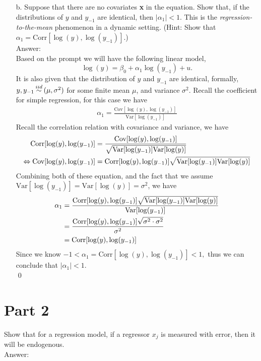 \documentclass[10pt]{article}
\newcommand\iid{\stackrel{\mathclap{iid}}{\sim}}
\newcommand{\V}{\text{Var}}
\newcommand{\corr}{\text{Corr}}
\newcommand{\cov}{\text{Cov}}
\begin{document}
\begin{enumerate}
\item[b.] Suppose that there are no covariates \textbf{x} in the equation. Show that, if the distributions of $y$ and $y_{-1}$ are identical, then $|\alpha_1|<1$. This is the \textit{regression-to-the-mean}
phenomenon in a dynamic setting. (Hint: Show that $\alpha_1=\corr[\log(y),\log(y_{-1})].$)
\\ Answer: \\
Based on the prompt we will have the following linear model,
\[\log(y)=\beta_0+\alpha_1\log(y_{-1})+u.\]
It is also given that the distribution of $y$ and $y_{-1}$ are identical, formally, $y,y_{-1}\iid(\mu,\sigma^2)$ for some finite mean $\mu$, and variance $\sigma^2$. Recall the coefficient for simple regression, for this case we have
\begin{align}
    \alpha_1=\frac{\cov[\log(y),\log(y_{-1})]}{\V[\log(y_{-1})]}
\end{align}
Recall the correlation relation with covariance and variance, we have
\begin{align}
    \corr[\log(y),\log(y_{-1})]&=\frac{\cov[\log(y),\log(y_{-1})]}{\sqrt{\V[\log(y_{-1})]\V[\log(y)]}} \notag \\
    \Leftrightarrow \cov[\log(y),\log(y_{-1})]&= \corr[\log(y),\log(y_{-1})] \sqrt{\V[\log(y_{-1})]\V[\log(y)]}
\end{align}
Combining both of these equation, and the fact that we assume $\V[\log(y_{-1})]=\V[\log(y)]=\sigma^2$, we have
\begin{align}
    \alpha_1&=\frac{\corr[\log(y),\log(y_{-1})] \sqrt{\V[\log(y_{-1})]\V[\log(y)]}}{\V[\log(y_{-1})]} \notag \\
    &=\frac{\corr[\log(y),\log(y_{-1})] \sqrt{\sigma^2\cdot \sigma^2}}{\sigma^2} \notag \\
    &=\corr[\log(y),\log(y_{-1})]
\end{align}
Since we know $-1< \alpha_1=\corr[\log(y),\log(y_{-1})]<1,$ thus we can conclude that $|\alpha_1|<1.$ \\ \qed
\end{enumerate}

\section*{Part 2}
Show that for a regression model, if a regressor $x_j$ is measured with error, then it will be endogenous.
\\ Answer: \\
\end{document}
